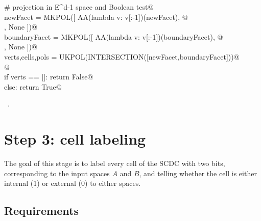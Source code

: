 \documentclass[11pt,oneside]{article}	%
\begin{document}
\begin{flushleft}
\begin{list}{}{}
\mbox{}\verb@   # projection in E^{d-1} space and Boolean test@\\
\mbox{}\verb@   newFacet = MKPOL([ AA(lambda v: v[:-1])(newFacet), @\\
\mbox{}, None ])@\\
\mbox{}\verb@   boundaryFacet = MKPOL([ AA(lambda v: v[:-1])(boundaryFacet), @\\
\mbox{}, None ])@\\
\mbox{}\verb@   verts,cells,pols = UKPOL(INTERSECTION([newFacet,boundaryFacet]))@\\
\mbox{}\verb@   @\\
\mbox{}\verb@   if verts == []: return False@\\
\mbox{}\verb@   else: return True@\\
\mbox{}\verb@@{\NWsep}
\end{list}
\vspace{-1ex}
\footnotesize\addtolength{\baselineskip}{-1ex}
\begin{list}{}{\setlength{\itemsep}{-\parsep}\setlength{\itemindent}{-\leftmargin}}
\item \NWtxtMacroRefIn\ .
\end{list}
\end{flushleft}








\section{Step 3: cell labeling}

The goal of this stage is to label every cell of the SCDC with two bits, corresponding to the input spaces $A$ and $B$, and telling whether the cell is either internal (1) or external (0) to either spaces.

\subsection{Requirements}
\end{document}
